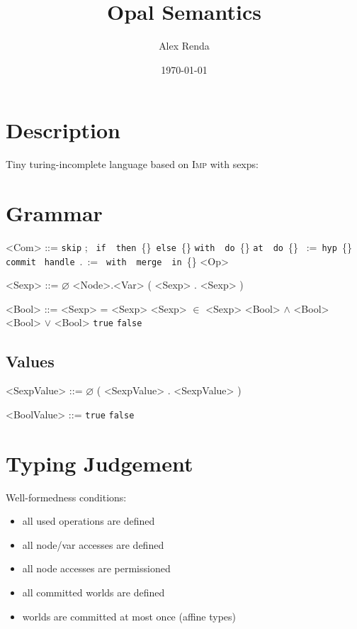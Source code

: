 \documentclass{article}
\title{Opal Semantics}
\author{Alex Renda}
\date{\today}
\newcommand{\skipcom}{\texttt{skip}}
\newcommand{\seqcom}[2]{#1;\ #2}
\newcommand{\ifcom}[3]{\texttt{if}\ #1\ \texttt{then}\ \{#2\}\ \texttt{else}\ \{#3\}}
\newcommand{\withcom}[2]{\texttt{with}\ #1\ \texttt{do}\ \{#2\}}
\newcommand{\atcom}[2]{\texttt{at}\ #1\ \texttt{do}\ \{#2\}}
\newcommand{\hypcom}[2]{#1\ :=\ \texttt{hyp}\ \{#2\}}
\newcommand{\commitcom}[1]{\texttt{commit}\ #1}
\newcommand{\handlecom}[6]{\texttt{handle}\ #1.#2\ := \textit{#3}\ \texttt{with}\ #4\ \texttt{merge}\ #5\ \texttt{in}\ \{#6\}} %
\newcommand{\true}{\texttt{true}}
\newcommand{\false}{\texttt{false}}
\newcommand{\imp}{\textsc{Imp}\xspace}
\begin{document}
\maketitle

\section{Description}

Tiny turing-incomplete language based on \imp with sexps:

\section{Grammar}

\begin{grammar}
<Com> ::= \skipcom
\alt \seqcom{}{}
\alt \ifcom{}{\synt{Com}}{}
\alt \withcom{}{}
\alt \atcom{}{}
\alt \hypcom{}{}
\alt \commitcom{}
\alt \handlecom{}{}{}{}{\synt{Sexp}}{\synt{Com}}
\alt <Op>

<Sexp> ::= $\varnothing$
\alt <Node>.<Var>
\alt ( <Sexp> . <Sexp> )

<Bool> ::= <Sexp> = <Sexp>
\alt <Sexp> $\in$ <Sexp>
\alt <Bool> $\land$ <Bool>
\alt <Bool> $\lor$ <Bool>
\alt \true
\alt \false

\end{grammar}

\subsection{Values}

\begin{grammar}
<SexpValue> ::= $\varnothing$
\alt ( <SexpValue> . <SexpValue> )

<BoolValue> ::= \true
\alt \false
\end{grammar}

\section{Typing Judgement}

Well-formedness conditions:
\begin{itemize}
\item all used operations are defined
\item all node/var accesses are defined
\item all node accesses are permissioned
\item all committed worlds are defined
\item worlds are committed at most once (affine types)
\end{itemize}
\end{document}
